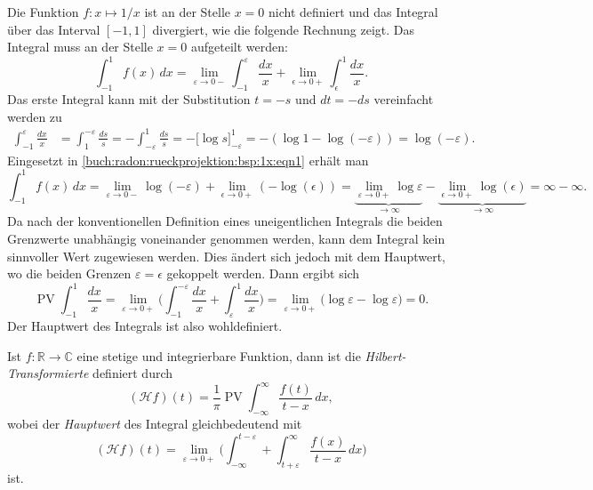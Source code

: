 \begin{beispiel}
Die Funktion $f\colon x\mapsto 1/x$ ist an der Stelle $x=0$ nicht definiert und
das Integral über das Interval $[-1,1]$ divergiert, wie die folgende Rechnung
zeigt.
Das Integral muss an der Stelle $x=0$ aufgeteilt werden:
\begin{equation}
\int_{-1}^1 f(x)\,dx
=
\lim_{\varepsilon\to 0-}
\int_{-1}^{\varepsilon} \frac{dx}{x}
+
\lim_{\epsilon\to 0+}
\int_{\epsilon}^{1} \frac{dx}{x}.
\label{buch:radon:rueckprojektion:bsp:1x:eqn1}
\end{equation}
Das erste Integral kann mit der Substitution $t=-s$ und $dt=-ds$ vereinfacht
werden zu
\begin{align*}
\int_{-1}^{\varepsilon} \frac{dx}{x}
&=
\int_{1}^{-\varepsilon} \frac{ds}{s}
=
-
\int_{-\varepsilon}^1 \frac{ds}{s}
=
-
\biggl[
\log s
\biggr]_{-\varepsilon}^1
=
-
(
\log 1 - \log(-\varepsilon)
)
=
\log(-\varepsilon).
\end{align*}
Eingesetzt in 
\eqref{buch:radon:rueckprojektion:bsp:1x:eqn1}
erhält man
\[
\int_{-1}^1 f(x)\,dx
=
\lim_{\varepsilon\to 0-}
\log(-\varepsilon)
+
\lim_{\epsilon\to 0+}
(-\log(\epsilon))
=
\underbrace{
\lim_{\varepsilon\to 0+}
\log\varepsilon
}_{\displaystyle\to \infty}
-
\underbrace{
\lim_{\epsilon\to 0+}
\log(\epsilon)
}_{\displaystyle\to \infty}
=
\infty - \infty.
\]
Da nach der konventionellen Definition eines uneigentlichen
Integrals die beiden Grenzwerte unabhängig voneinander genommen werden,
kann dem Integral kein sinnvoller Wert zugewiesen werden.
Dies ändert sich jedoch mit dem Hauptwert, wo die beiden Grenzen
$\varepsilon=\epsilon$ gekoppelt werden.
Dann ergibt sich
\[
\operatorname{PV}
\int_{-1}^1 \frac{dx}{x}
=
\lim_{\varepsilon\to 0+}
\biggl(
\int_{-1}^{-\varepsilon}\frac{dx}{x}
+
\int_{\varepsilon}^{1} \frac{dx}{x}
\biggr)
=
\lim_{\varepsilon\to 0+}
\biggl(
\log\varepsilon - \log\varepsilon
\biggr)
=
0.
\]
Der Hauptwert des Integrals ist also wohldefiniert.
\end{beispiel}

\begin{definition}
Ist $f\colon \mathbb{R}\to\mathbb{C}$ eine stetige und integrierbare
Funktion, dann ist die {\em Hilbert-Trans\-for\-mier\-te} definiert durch
\[
(\mathscr{H}f)(t)
=
\frac{1}{\pi} \operatorname{PV} \int_{-\infty}^\infty \frac{f(t)}{t-x}\,dx,
\]
wobei der {\em Hauptwert} des Integral gleichbedeutend mit
\[
(\mathscr{H}f)(t)
=
\lim_{\varepsilon\to 0+}
\biggl(
\int_{-\infty}^{t-\varepsilon}+\int_{t+\varepsilon}^\infty
\frac{f(x)}{t-x}\,dx
\biggr)
\]
ist.
\end{definition}

